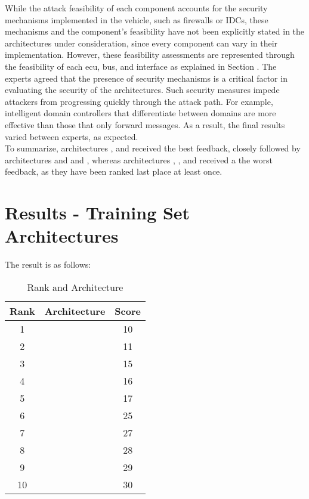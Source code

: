 While the attack feasibility of each component accounts for the security mechanisms implemented in the vehicle, such as firewalls or IDCs, 
these mechanisms and the component's feasibility have not been explicitly stated in the architectures under consideration, since every component can vary in their implementation.
However, these feasibility assessments are represented through the feasibility of each \acrshort{ecu}, bus, and interface as explained in Section .
The experts agreed that the presence of security mechanisms is a critical factor in evaluating the security of the architectures.
Such security measures impede attackers from progressing quickly through the attack path. 
For example, intelligent domain controllers that differentiate between domains are more effective than those that only forward messages.
As a result, the final results varied between experts, as expected.\\

To summarize, architectures , and  received the best feedback, closely followed by architectures  and  and ,
whereas architectures , , and  received a the worst feedback, as they have been ranked last place at least once.

\section{Results - Training Set Architectures}

The result is as follows:

\begin{table}[h]
    \label{table:survey}
    \centering
    \caption{Rank and Architecture}
    \begin{tabular}{ |c|c|c| } 
    \hline
    Rank & Architecture & Score \\
    \hline
    1 & \nameref{fig:architecture3} & 10 \\
    2 & \nameref{fig:architecture8} & 11 \\
    3 & \nameref{fig:architecture6} & 15 \\
    4 & \nameref{fig:architecture10} & 16 \\
    5 & \nameref{fig:architecture2} & 17 \\
    6 & \nameref{fig:architecture1} & 25 \\
    7 & \nameref{fig:architecture5} & 27 \\
    8 & \nameref{fig:architecture7} & 28 \\
    9 & \nameref{fig:architecture9} & 29 \\
    10 & \nameref{fig:architecture4} & 30\\
    \hline
    \end{tabular}
\end{table}
